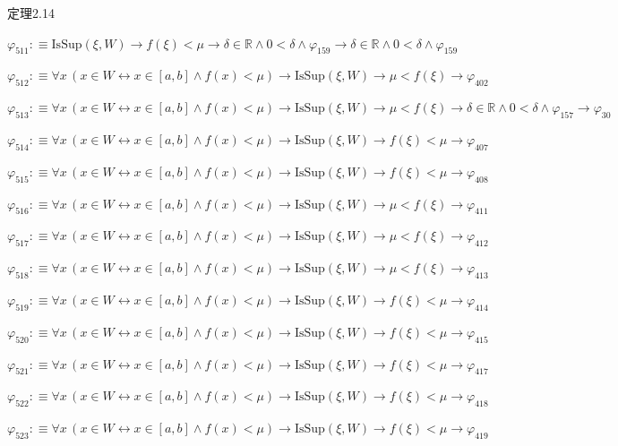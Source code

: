 \begin{fullproof}{定理2.14}
\begin{abbrevlist}
\item $\varphi_{511} :\equiv \mathrm{IsSup}(\xi,W) \to f(\xi) < \mu \to \delta \in \mathbb{R} \land 0 < \delta \land \varphi_{159} \to \delta \in \mathbb{R} \land 0 < \delta \land \varphi_{159}$
\item $\varphi_{512} :\equiv \forall x\,(x \in W \leftrightarrow x \in [a,b] \land f(x) < \mu) \to \mathrm{IsSup}(\xi,W) \to \mu < f(\xi) \to \varphi_{402}$
\item $\varphi_{513} :\equiv \forall x\,(x \in W \leftrightarrow x \in [a,b] \land f(x) < \mu) \to \mathrm{IsSup}(\xi,W) \to \mu < f(\xi) \to \delta \in \mathbb{R} \land 0 < \delta \land \varphi_{157} \to \varphi_{30}$
\item $\varphi_{514} :\equiv \forall x\,(x \in W \leftrightarrow x \in [a,b] \land f(x) < \mu) \to \mathrm{IsSup}(\xi,W) \to f(\xi) < \mu \to \varphi_{407}$
\item $\varphi_{515} :\equiv \forall x\,(x \in W \leftrightarrow x \in [a,b] \land f(x) < \mu) \to \mathrm{IsSup}(\xi,W) \to f(\xi) < \mu \to \varphi_{408}$
\item $\varphi_{516} :\equiv \forall x\,(x \in W \leftrightarrow x \in [a,b] \land f(x) < \mu) \to \mathrm{IsSup}(\xi,W) \to \mu < f(\xi) \to \varphi_{411}$
\item $\varphi_{517} :\equiv \forall x\,(x \in W \leftrightarrow x \in [a,b] \land f(x) < \mu) \to \mathrm{IsSup}(\xi,W) \to \mu < f(\xi) \to \varphi_{412}$
\item $\varphi_{518} :\equiv \forall x\,(x \in W \leftrightarrow x \in [a,b] \land f(x) < \mu) \to \mathrm{IsSup}(\xi,W) \to \mu < f(\xi) \to \varphi_{413}$
\item $\varphi_{519} :\equiv \forall x\,(x \in W \leftrightarrow x \in [a,b] \land f(x) < \mu) \to \mathrm{IsSup}(\xi,W) \to f(\xi) < \mu \to \varphi_{414}$
\item $\varphi_{520} :\equiv \forall x\,(x \in W \leftrightarrow x \in [a,b] \land f(x) < \mu) \to \mathrm{IsSup}(\xi,W) \to f(\xi) < \mu \to \varphi_{415}$
\item $\varphi_{521} :\equiv \forall x\,(x \in W \leftrightarrow x \in [a,b] \land f(x) < \mu) \to \mathrm{IsSup}(\xi,W) \to f(\xi) < \mu \to \varphi_{417}$
\item $\varphi_{522} :\equiv \forall x\,(x \in W \leftrightarrow x \in [a,b] \land f(x) < \mu) \to \mathrm{IsSup}(\xi,W) \to f(\xi) < \mu \to \varphi_{418}$
\item $\varphi_{523} :\equiv \forall x\,(x \in W \leftrightarrow x \in [a,b] \land f(x) < \mu) \to \mathrm{IsSup}(\xi,W) \to f(\xi) < \mu \to \varphi_{419}$

\end{abbrevlist}
\end{fullproof}
